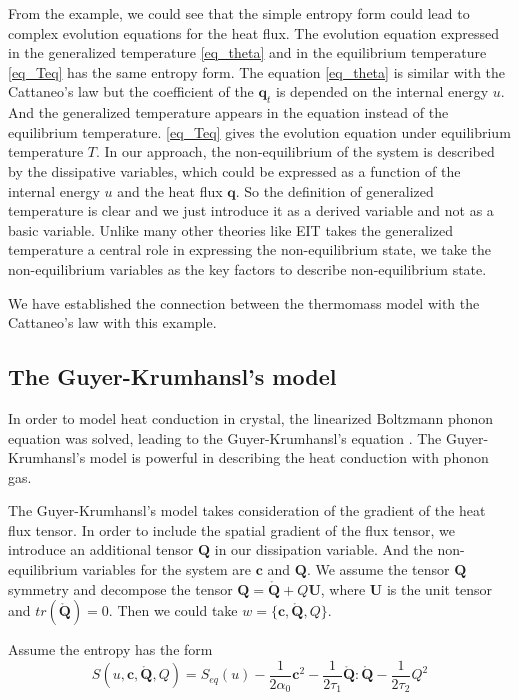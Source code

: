 \documentclass[a4paper]{article}
\begin{document}
From the example, we could see that the simple entropy form could lead to complex evolution equations for the heat flux. The evolution equation expressed in the generalized temperature \eqref{eq_theta} and in the equilibrium temperature \eqref{eq_Teq} has the same entropy form. The equation  \eqref{eq_theta} is similar with the Cattaneo's law but the coefficient of the $\mathbf{q}_t$ is depended on the internal energy $u$. And the generalized temperature appears in the equation instead of the equilibrium temperature. \eqref{eq_Teq} gives the evolution equation under equilibrium temperature $T$. In our approach, the non-equilibrium of the system is described by the dissipative variables, which could be expressed as a function of the internal energy $u$ and the heat flux $\mathbf{q}$. So the definition of generalized temperature is clear and we just introduce it as a derived variable and not as a basic variable. Unlike many other theories like EIT takes the generalized temperature a central role in expressing the non-equilibrium state, we take the non-equilibrium variables as the key factors to describe non-equilibrium state.

We have established the connection between the thermomass model with the Cattaneo's law with this example.
\subsection{The Guyer-Krumhansl's model}
In order to model heat conduction in crystal, the linearized Boltzmann phonon equation was solved, leading to the Guyer-Krumhansl's equation \cite{guyer1966solution}. The Guyer-Krumhansl's model is powerful in describing the heat conduction with phonon gas.

The Guyer-Krumhansl's model takes consideration of the gradient of the heat flux tensor. In order to include the spatial gradient of the flux tensor, we introduce an additional tensor $\mathbf{Q}$ in our dissipation variable. And the non-equilibrium variables for the system are $\mathbf{c}$ and $\mathbf{Q}$. We assume the tensor $\mathbf{Q}$ symmetry and decompose the tensor $\mathbf{Q}=\mathring{\mathbf{Q}}+Q\mathbf{U}$, where $\mathbf{U}$ is the unit tensor and $tr(\mathring{\mathbf{Q}})=0$. Then we could take $w=\{\mathbf{c},\mathring{\mathbf{Q}},Q\}$.

Assume the entropy has the form
\begin{equation}
S(u,\mathbf{c},\mathring{\mathbf{Q}},Q)=S_{eq}(u)-\frac{1}{2 \alpha_0}\mathbf{c}^2-\frac{1}{2\tau_1} {\mathring{\mathbf{Q}}}:{\mathring{\mathbf{Q}}}-\frac{1}{2\tau_2}Q^2
\end{equation}
\end{document}
